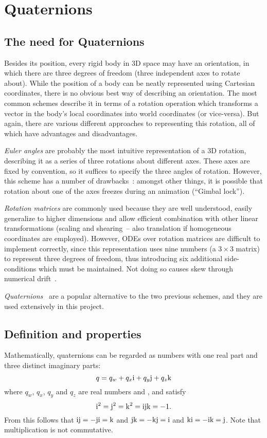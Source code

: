 \section{Quaternions\label{quaternions}}
\subsection{The need for Quaternions}
Besides its position, every rigid body in 3D space may have an orientation, in which there are
three degrees of freedom (three independent axes to rotate about).
While the position of a body can be neatly represented using Cartesian coordinates, there is
no obvious best way of describing an orientation. The most common schemes describe
it in terms of a rotation operation which transforms a vector in the body's local
coordinates into world coordinates (or vice-versa). But again, there are various different
approaches to representing this rotation, all of which have advantages and disadvantages.

\emph{Euler angles} are probably the most intuitive representation of a 3D rotation, describing
it as a series of three rotations about different axes. These axes are fixed by convention, so it
suffices to specify the three angles of rotation. However, this scheme has a number of
drawbacks~\cite{Saunders:PhD,Shoemake:85}: amongst other things, it is possible that rotation
about one of the axes freezes during an animation (``Gimbal lock'').

\emph{Rotation matrices} are commonly used because they are well understood, easily generalize
to higher dimensions and allow efficient combination with other linear transformations (scaling
and shearing~-- also translation if homogeneous coordinates are employed). However, ODEs over
rotation matrices are difficult to implement correctly, since this representation uses nine
numbers (a $3\times3$ matrix) to represent three degrees of freedom, thus introducing six
additional side-conditions which must be maintained. Not doing so causes skew through numerical
drift~\cite{Saunders:PhD}.

\emph{Quaternions}~\cite{Shoemake:85,Eberly:01,MathWorld:Quaternion} are a popular alternative
to the two previous schemes, and they are used extensively in this project.

\subsection{Definition and properties}
Mathematically, quaternions can be regarded as numbers with one real part and three
distinct imaginary parts:
\begin{equation}
q = q_w + q_x\mathrm{i} + q_y\mathrm{j} + q_z\mathrm{k}
\end{equation}
where $q_w$, $q_x$, $q_y$ and $q_z$ are real numbers and \qi{}, \qj{} and \qk{} satisfy
\begin{equation}
\mathrm{i}^2 = \mathrm{j}^2 = \mathrm{k}^2 = \mathrm{i}\mathrm{j}\mathrm{k} = -1.
\end{equation}
From this follows that
$\mathrm{i}\mathrm{j} = -\mathrm{j}\mathrm{i} = \mathrm{k}$ and
$\mathrm{j}\mathrm{k} = -\mathrm{k}\mathrm{j} = \mathrm{i}$ and
$\mathrm{k}\mathrm{i} = -\mathrm{i}\mathrm{k} = \mathrm{j}$.
Note that multiplication is not commutative.

